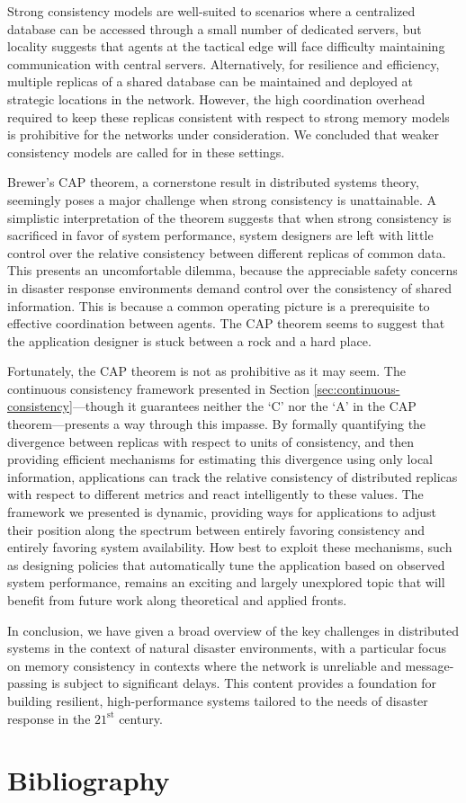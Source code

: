 \documentclass[]             %
{NASA}                       %
\theoremstyle{definition}
\begin{document}
Strong consistency models are well-suited to scenarios where a
centralized database can be accessed through a small number of
dedicated servers, but locality suggests that agents at the tactical
edge will face difficulty maintaining communication with central
servers. Alternatively, for resilience and efficiency, multiple
replicas of a shared database can be maintained and deployed at
strategic locations in the network. However, the high coordination
overhead required to keep these replicas consistent with respect to
strong memory models is prohibitive for the networks under
consideration. We concluded that weaker consistency models are called
for in these settings.

Brewer's CAP theorem, a cornerstone result in distributed systems
theory, seemingly poses a major challenge when strong consistency is
unattainable. A simplistic interpretation of the theorem suggests that
when strong consistency is sacrificed in favor of system performance,
system designers are left with little control over the relative
consistency between different replicas of common data. This presents
an uncomfortable dilemma, because the appreciable safety concerns in
disaster response environments demand control over the consistency of
shared information. This is because a common operating picture is a
prerequisite to effective coordination between agents. The CAP theorem
seems to suggest that the application designer is stuck between a rock
and a hard place.

Fortunately, the CAP theorem is not as prohibitive as it may seem. The
continuous consistency framework presented in Section
\ref{sec:continuous-consistency}---though it guarantees neither the
`C' nor the `A' in the CAP theorem---presents a way through this
impasse. By formally quantifying the divergence between replicas with
respect to units of consistency, and then providing efficient
mechanisms for estimating this divergence using only local
information, applications can track the relative consistency of
distributed replicas with respect to different metrics and react
intelligently to these values. The framework we presented is dynamic,
providing ways for applications to adjust their position along the
spectrum between entirely favoring consistency and entirely favoring
system availability. How best to exploit these mechanisms, such as
designing policies that automatically tune the application based on
observed system performance, remains an exciting and largely
unexplored topic that will benefit from future work along theoretical
and applied fronts.

In conclusion, we have given a broad overview of the key challenges in
distributed systems in the context of natural disaster environments,
with a particular focus on memory consistency in contexts where the
network is unreliable and message-passing is subject to significant
delays. This content provides a foundation for building resilient,
high-performance systems tailored to the needs of disaster response in
the $21^\textrm{st}$ century.

\section*{Bibliography}\label{bibliography}
\printbibliography
\end{document}
